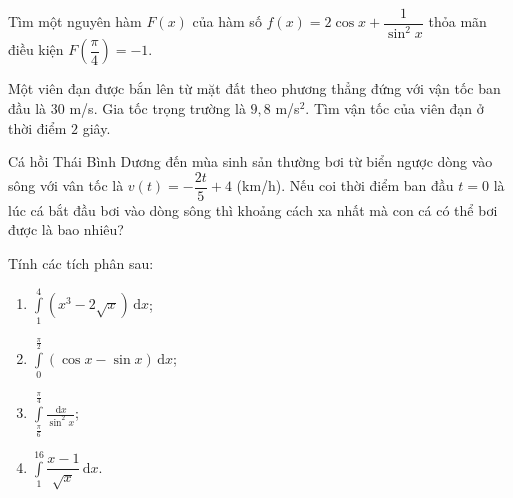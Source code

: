 \begin{bt} %
	 Tìm một nguyên hàm $F(x)$ của hàm số $f(x)=2\cos x + \dfrac{1}{\sin^2 x}$ thỏa mãn điều kiện $F\left(\dfrac{\pi}{4}\right) = -1$.
\end{bt}

\begin{bt}  %
	Một viên đạn được bắn lên từ mặt đất theo phương thẳng đứng với vận tốc ban đầu là $30$  m/s. Gia tốc trọng trường là $9{,}8 $ m/s$^2$. Tìm vận tốc của viên đạn ở thời điểm $2$ giây.
\end{bt}

\begin{bt}%
	Cá hồi Thái Bình Dương đến mùa sinh sản thường bơi từ biển ngược dòng vào sông với vân tốc là $v(t) = -\dfrac{2t}{5} +4 $ (km/h). Nếu coi thời điểm ban đầu $t=0$ là lúc cá bắt đầu bơi vào dòng sông thì khoảng cách xa nhất mà con cá có thể bơi được là bao nhiêu?
\end{bt}

\begin{bt}%
	Tính các tích phân sau:
	\begin{enumerate}
		\item $\displaystyle \int\limits_{1}^{4} (x^3 -2\sqrt{x})\mathrm{\,d}x$;
		\item $\displaystyle \int\limits_{0}^{\frac{\pi}{2}} (\cos x - \sin x)\mathrm{\,d}x$;
		\item $ \displaystyle \int\limits_{\frac{\pi}{6}}^{\frac{\pi}{4}} \frac{\mathrm{\,d}x}{\sin^2 x}$;
		\item $\displaystyle \int\limits_{1}^{16} \dfrac{x-1}{\sqrt{x}}\mathrm{\,d}x$.
	\end{enumerate}
\end{bt}

